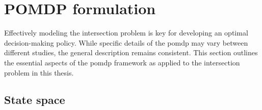 \section{POMDP formulation}
\label{sec:pomdp_fomulation}
Effectively modeling the intersection problem is key for developing an optimal decision-making policy. While specific details of the \gls{pomdp} may vary between different studies, the general description remains consistent. This section outlines the essential aspects of the \gls{pomdp} framework as applied to the intersection problem in this thesis.

\subsection{State space}
\label{sec:pomdp_statespace}

